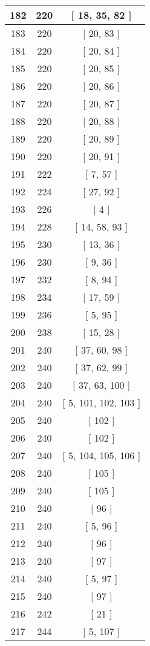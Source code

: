 \begin{center}
\begin{longtable}[H]{|| c c c ||}
\hline
182 & 220 & [ 18, 35, 82 ] \\ 
\hline
183 & 220 & [ 20, 83 ] \\ 
\hline
184 & 220 & [ 20, 84 ] \\ 
\hline
185 & 220 & [ 20, 85 ] \\ 
\hline
186 & 220 & [ 20, 86 ] \\ 
\hline
187 & 220 & [ 20, 87 ] \\ 
\hline
188 & 220 & [ 20, 88 ] \\ 
\hline
189 & 220 & [ 20, 89 ] \\ 
\hline
190 & 220 & [ 20, 91 ] \\ 
\hline
191 & 222 & [ 7, 57 ] \\ 
\hline
192 & 224 & [ 27, 92 ] \\ 
\hline
193 & 226 & [ 4 ] \\ 
\hline
194 & 228 & [ 14, 58, 93 ] \\ 
\hline
195 & 230 & [ 13, 36 ] \\ 
\hline
196 & 230 & [ 9, 36 ] \\ 
\hline
197 & 232 & [ 8, 94 ] \\ 
\hline
198 & 234 & [ 17, 59 ] \\ 
\hline
199 & 236 & [ 5, 95 ] \\ 
\hline
200 & 238 & [ 15, 28 ] \\ 
\hline
201 & 240 & [ 37, 60, 98 ] \\ 
\hline
202 & 240 & [ 37, 62, 99 ] \\ 
\hline
203 & 240 & [ 37, 63, 100 ] \\ 
\hline
204 & 240 & [ 5, 101, 102, 103 ] \\ 
\hline
205 & 240 & [ 102 ] \\ 
\hline
206 & 240 & [ 102 ] \\ 
\hline
207 & 240 & [ 5, 104, 105, 106 ] \\ 
\hline
208 & 240 & [ 105 ] \\ 
\hline
209 & 240 & [ 105 ] \\ 
\hline
210 & 240 & [ 96 ] \\ 
\hline
211 & 240 & [ 5, 96 ] \\ 
\hline
212 & 240 & [ 96 ] \\ 
\hline
213 & 240 & [ 97 ] \\ 
\hline
214 & 240 & [ 5, 97 ] \\ 
\hline
215 & 240 & [ 97 ] \\ 
\hline
216 & 242 & [ 21 ] \\ 
\hline
217 & 244 & [ 5, 107 ] \\ 

\end{longtable}
\end{center}
